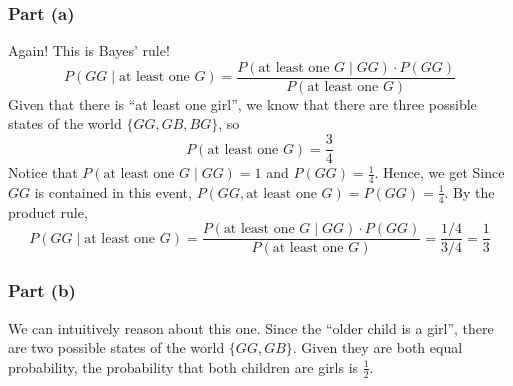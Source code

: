 \documentclass[11pt]{article}
\begin{document}
\subsubsection*{Part (a)}
Again! This is Bayes' rule!
\[
P(GG\mid \text{at least one } G)=\frac{P(\text{at least one } G\mid GG)\cdot P(GG)}{P(\text{at least one } G)}
\]
Given that there is ``at least one girl'', we know that there are three possible states of the world $\{GG,GB,BG\}$, so 
\[
P(\text{at least one } G)=\frac{3}{4}
\]
Notice that $P(\text{at least one } G\mid GG)=1$ and $P(GG)=\frac{1}{4}$. Hence, we get
Since $GG$ is contained in this event, $P(GG,\text{at least one } G)=P(GG)=\tfrac{1}{4}$. By the product rule,
\[
P(GG\mid \text{at least one } G)=\frac{P(\text{at least one } G\mid GG)\cdot P(GG)}{P(\text{at least one } G)}=\frac{1/4}{3/4}=\frac{1}{3}
\]

\subsubsection*{Part (b)}
We can intuitively reason about this one. Since the ``older child is a girl'', there are two possible states of the world $\{GG,GB\}$. Given they are both equal probability, the probability that both children are girls is $\frac{1}{2}$.
\end{document}
